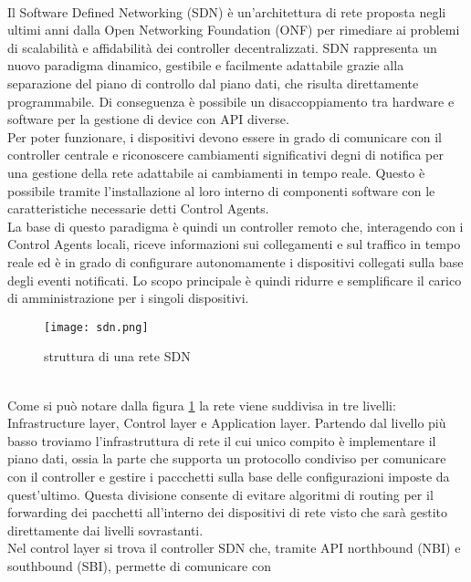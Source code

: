 \\Il Software Defined Networking (SDN) è un'architettura di rete proposta negli ultimi anni dalla Open Networking Foundation (ONF) \cite{ONF} per rimediare ai problemi di scalabilità e affidabilità dei controller decentralizzati.
SDN rappresenta un nuovo paradigma dinamico, gestibile e facilmente adattabile grazie alla separazione del piano di controllo dal piano dati, che risulta direttamente programmabile. 
Di conseguenza è possibile un disaccoppiamento tra hardware e software per la gestione di device con API diverse.
\\Per poter funzionare, i dispositivi devono essere in grado di comunicare con il controller centrale e riconoscere cambiamenti significativi degni di notifica per una gestione della rete adattabile ai cambiamenti in tempo reale. 
Questo è possibile tramite l'installazione al loro interno di componenti software con le caratteristiche necessarie
detti Control Agents.
\\La base di questo paradigma è quindi un controller remoto che, interagendo con i Control Agents
locali, riceve informazioni sui collegamenti e sul traffico in tempo reale ed è in grado di
configurare autonomamente i dispositivi collegati sulla base degli eventi notificati. Lo scopo
principale è quindi ridurre e semplificare il carico di amministrazione per i singoli dispositivi.
\begin{figure}[h]
    \centering
   \texttt{[image: sdn.png]}
    \caption{struttura di una rete SDN}
    \label{fig:sdn}
\end{figure}
\\Come si può notare dalla figura \ref{fig:sdn} la rete viene suddivisa in tre livelli: Infrastructure layer, Control layer e Application layer.
Partendo dal livello più basso troviamo l'infrastruttura di rete il cui unico compito è implementare il piano dati, ossia la parte che supporta un protocollo condiviso per comunicare con il controller e gestire
i paccchetti sulla base delle configurazioni imposte da quest'ultimo. 
Questa divisione consente di evitare algoritmi
di routing per il forwarding dei pacchetti all'interno dei dispositivi di rete visto che sarà
gestito direttamente dai livelli sovrastanti. 
\\Nel control layer si trova il controller SDN che, tramite API northbound (NBI) e southbound (SBI), permette di comunicare con
